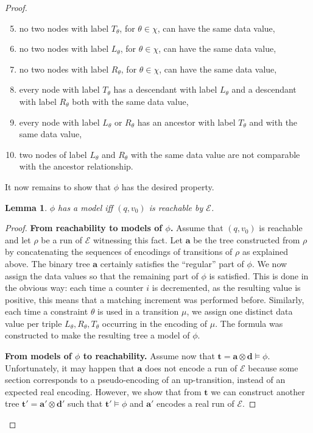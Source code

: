 \documentclass{CSML}
\newtheorem{lemma}[theorem]{Lemma}
\newcommand\Ea{\mathcal{E}}
\newcommand\tree{\boldsymbol{t}}
\newcommand\atree{\boldsymbol{a}}
\newcommand\dtree{\boldsymbol{d}}
\begin{document}
\begin{proof}
\begin{enumerate}[label=\enspace(\arabic*)]
\setcounter{enumi}{4}
\item \label{it:Ttheta} no two nodes with label $T_\theta$, for $\theta \in \chi$,
      can have the same data value,
\item \label{it:Ltheta} no two nodes with label $L_\theta$, for $\theta \in \chi$, 
       can have the same data value,
\item \label{it:Rtheta} no two nodes with label $R_\theta$, for $\theta \in \chi$, 
       can have the same data value,
\item \label{it:TthetaLRtheta} every node with label $T_\theta$ has a descendant with label $L_\theta$ 
      and a descendant with label $R_\theta$
      both with the same data value,
\item \label{it:LRthetaTtheta} every node with label $L_\theta$ or $R_\theta$ has an ancestor with label $T_\theta$ 
      and with the same data value,
\item \label{it:LRtheta} two nodes of label $L_\theta$ and $R_\theta$ with the same data value
  are not comparable with the ancestor relationship.
\end{enumerate}
It now remains to show that $\phi$ has the desired property.
\begin{lemma}\label{lemma-ebvass-fo}
$\phi$ has a model iff $(q, v_0)$ is reachable by $\Ea$.
\end{lemma}
\begin{proof}
{\bf From reachability to models of $\phi$.}
Assume that $(q, v_0)$ is reachable and let $\rho$ be a run of $\Ea$ witnessing this fact.
Let $\atree$ be the tree constructed from $\rho$ by concatenating the sequences
of encodings of transitions of $\rho$ as explained above. 
The binary tree $\atree$ certainly satisfies the ``regular'' part of $\phi$. 
We now assign the data values so that
the remaining part of $\phi$ is satisfied. This is done in the obvious way:
each time a counter $i$ is decremented, as the resulting value is positive,
this means that a matching increment was performed before. Similarly, each time
a constraint $\theta$ is used in a transition $\mu$, we assign one distinct
data value per triple $L_\theta,R_\theta,T_\theta$ 
occurring in the encoding of
$\mu$. The formula was constructed to make the resulting tree a model of $\phi$.

{\bf From models of $\phi$ to reachability.}
Assume now that $\tree=\atree\otimes \dtree \models \phi$. 
Unfortunately, it may happen that $\atree$ does not encode a run of $\Ea$ because some section corresponds to a pseudo-encoding of an up-transition, 
instead of an expected real encoding. 
However, we show that from $\tree$ we can construct another tree
$\tree'=\atree'\otimes\dtree'$ such that $\tree' \models \phi$ 
and $\atree'$ encodes a real run of $\Ea$.


\end{proof}
\end{proof}
\end{document}
